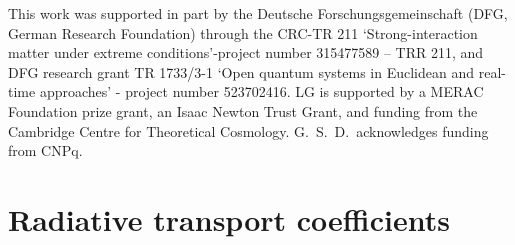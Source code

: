 \documentclass[a4paper, amsfonts, amssymb, amsmath, reprint, showkeys, nofootinbib, twoside,notitlepage,onecolumn]{revtex4-1}
\theoremstyle{definition}
\theoremstyle{theorem}
\begin{document}
This work was supported in part by the Deutsche Forschungsgemeinschaft (DFG, German Research Foundation) through the CRC-TR 211 ‘Strong-interaction matter under extreme conditions’-project number 315477589 – TRR 211, and DFG research grant TR 1733/3-1 ‘Open quantum systems in Euclidean and real-time approaches’ - project number 523702416. LG is supported by a MERAC Foundation prize grant, an Isaac Newton Trust Grant, and funding from the Cambridge Centre for Theoretical Cosmology. G.~S.~D.~acknowledges funding from CNPq.

\appendix


\section{Radiative transport coefficients}\label{AppAAA}
\end{document}

